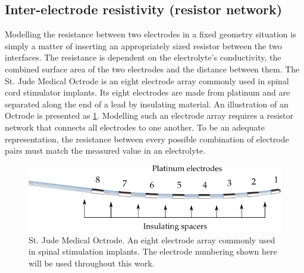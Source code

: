   \subsection{Inter-electrode resistivity (resistor network)}


    Modelling the resistance between two electrodes in a fixed geometry situation is simply a matter of inserting an appropriately sized resistor between the two interfaces.
    The resistance is dependent on the electrolyte's conductivity, the combined surface area of the two electrodes and the distance between them.
    The St. Jude Medical Octrode is an eight electrode array commonly used in spinal cord stimulator implants.
    Its eight electrodes are made from platinum and are separated along the end of a lead by insulating material.
    An illustration of an Octrode is presented as \cref{fig:StJudeOctrode_Labelled}.
    Modelling such an electrode array requires a resistor network that connects all electrodes to one another.
    To be an adequate representation, the resistance between every possible combination of electrode pairs must match the measured value in an electrolyte.

    \begin{figure}
      \centering
      \includegraphics{content/pt2/07-InterfaceModel/graphics/StJudeOctrodeDiagram}
      \caption{\label{fig:StJudeOctrode_Labelled}St. Jude Medical Octrode. An eight electrode array commonly used in spinal stimulation implants. The electrode numbering shown here will be used throughout this work.}
    \end{figure}

